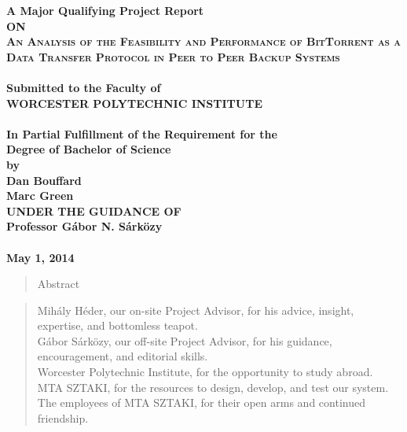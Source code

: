 \documentclass[12pt]{report}
\begin{document}
\begin{titlepage}
\begin{center}
\thispagestyle{empty}
\Large{\textbf{A Major Qualifying Project Report\\ \large{ON}}}\\[0.7cm]
\LARGE{\textsc {\textbf{An Analysis of the Feasibility and Performance of BitTorrent as a Data Transfer Protocol in Peer to Peer Backup Systems}}}\\[0.5cm]
\vspace{0.2cm}
\Large{\textbf{\\Submitted to the Faculty of }}
\LARGE{\textbf{\\WORCESTER POLYTECHNIC INSTITUTE\\}}
\vspace{0.5cm}
\Large{\textbf{\\In Partial Fulfillment of the Requirement for the}}
\Large{\textbf{\\Degree of Bachelor of Science}}
\vspace{0.5cm}
\Large{\textbf{\\by}}\\[0.5cm]
\large{\textbf{Dan Bouffard}}\\
\large{\textbf{Marc Green}}\\
\vspace{0.5cm}
\large{\textbf{UNDER THE GUIDANCE OF}}\\
\large{\textbf{Professor G\'abor N. S\'ark\"ozy}}\\
\vspace{1cm}
\large{\textbf{\\May 1, 2014}}\\
\end{center}
\end{titlepage}

\begin{abstract}
Abstract
\end{abstract}

\renewcommand{\abstractname}{Acknowledgements}
\begin{abstract}
Mih\'aly H\'eder, our on-site Project Advisor, for his advice, insight, expertise, and bottomless teapot.\\

\noindent G\'abor S\'ark\"ozy, our off-site Project Advisor, for his guidance, encouragement, and editorial skills. \\

\noindent Worcester Polytechnic Institute, for the opportunity to study abroad. \\

\noindent MTA SZTAKI, for the resources to design, develop, and test our system. \\

\noindent The employees of MTA SZTAKI, for their open arms and continued friendship.
\end{abstract}
\end{document}
